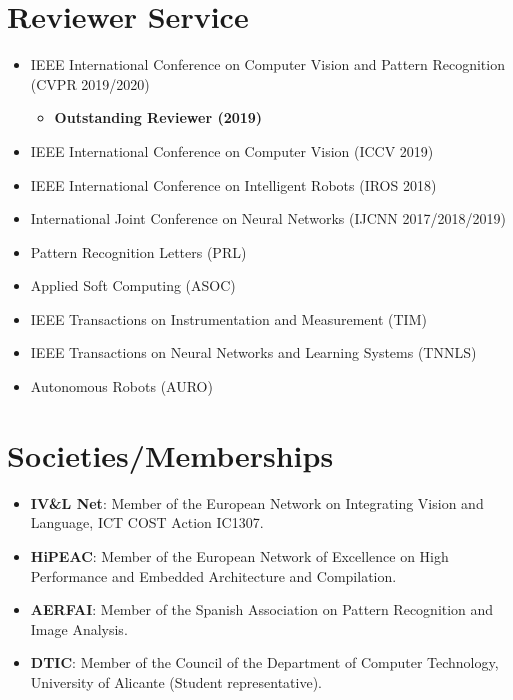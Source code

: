 \documentclass[8pt]{article}
\begin{document}
\section*{Reviewer Service}

\begin{itemize}
  \item IEEE International Conference on Computer Vision and Pattern Recognition (CVPR 2019/2020)
  \begin{itemize}
    \item \textbf{Outstanding Reviewer (2019)}
  \end{itemize}
  \item IEEE International Conference on Computer Vision (ICCV 2019)
  \item IEEE International Conference on Intelligent Robots (IROS 2018)
  \item International Joint Conference on Neural Networks (IJCNN 2017/2018/2019)
  \item Pattern Recognition Letters (PRL)
  \item Applied Soft Computing (ASOC)
  \item IEEE Transactions on Instrumentation and Measurement (TIM)
  \item IEEE Transactions on Neural Networks and Learning Systems (TNNLS)
  \item Autonomous Robots (AURO)
\end{itemize}

\section*{Societies/Memberships}

\begin{itemize}
	\item \textbf{IV\&L Net}: Member of the European Network on Integrating Vision and Language, ICT COST Action IC1307.
	\item \textbf{HiPEAC}: Member of the European Network of Excellence on High Performance and Embedded Architecture and Compilation.
	\item \textbf{AERFAI}: Member of the Spanish Association on Pattern Recognition and Image Analysis.
	\item \textbf{DTIC}: Member of the Council of the Department of Computer Technology, University of Alicante (Student representative).
\end{itemize}
\end{document}
